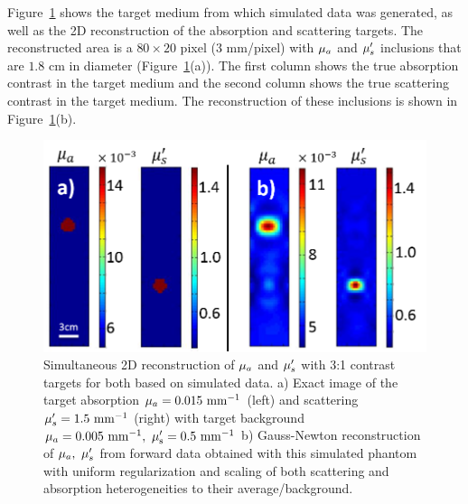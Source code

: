 Figure~\ref{fig:2Dsim} shows the target medium from which simulated data was generated, as well as the 2D reconstruction of the absorption and scattering targets. The reconstructed area is a $80\times 20$ pixel ($3$ mm/pixel) with $\mua$ and $\musp$ inclusions that are $1.8$ cm in diameter (Figure~\ref{fig:2Dsim}(a)). The first column shows the true absorption contrast in the target medium and the second column shows the true scattering contrast in the target medium. The reconstruction of these inclusions is shown in Figure~\ref{fig:2Dsim}(b).
\begin{figure}[t]
\begin{center}
\includegraphics[width=12cm]{./figures/4_Gen3/2Dsim.png}
\caption[Simultaneous 2D reconstruction of $\mua$ and $\musp$ with 3:1 contrast targets for both based on simulated data]{Simultaneous 2D reconstruction of $\mua$ and $\musp$ with 3:1 contrast targets for both based on simulated data. a) Exact image of the target absorption $\mu_a=0.015~\rm{mm}^{-1}$ (left) and scattering $\mu_s^{\prime}=1.5~\rm{mm}^{-1}$ (right) with target background $\mu_a=0.005~\rm{mm}^{-1},~\mu_s^{\prime}=0.5~\rm{mm}^{-1}$ b) Gauss-Newton reconstruction of $\mu_a,~\mu_s^{\prime}$ from forward data obtained with this simulated phantom with uniform regularization and scaling of both scattering and absorption heterogeneities to their average/background.}
\label{fig:2Dsim}
\end{center}
\end{figure}

